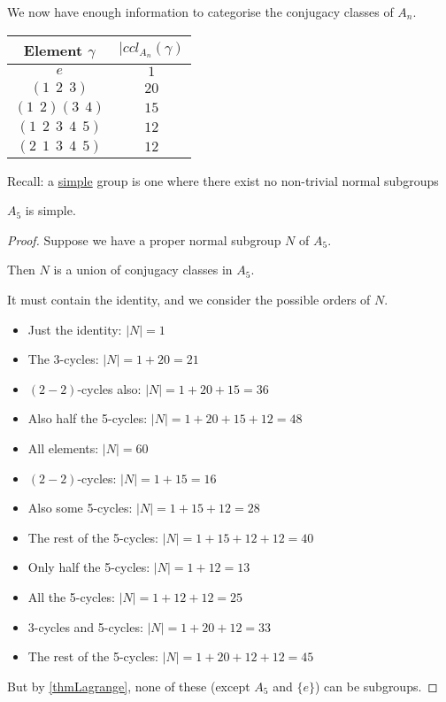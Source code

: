 \documentclass[../Main.tex]{subfiles}
\begin{document}
\begin{example}
\begin{itemize}
    \end{itemize}
    We now have enough information to categorise the conjugacy classes of $A_n$.\par
    \begin{tabular}{c|c}
        Element $\gamma$ & $|ccl_{A_n}(\gamma)$ \\
        \hline
        $e$ & $1$ \\
        $(1~~2~~3)$ & $20$ \\
        $(1~~2)(3~~4)$ & $15$ \\
        $(1~~2~~3~~4~~5)$ & $12$ \\
        $(2~~1~~3~~4~~5)$ & $12$
    \end{tabular}
\end{example}
Recall: a \underline{simple} group is one where there exist no non-trivial normal subgroups\par %
\begin{theorem}
    $A_5$ is simple. \label{thmA5Simple}
\end{theorem}
\begin{proof}
    Suppose we have a proper normal subgroup $N$ of $A_5$.\par
    Then $N$ is a union of conjugacy classes in $A_5$.\par
    It must contain the identity, and we consider the possible orders of $N$.
    \begin{itemize}
        \item Just the identity: $|N| = 1$
        \item The 3-cycles: $|N| = 1+20=21$
        \item $(2-2)$-cycles also: $|N| = 1+20+15 = 36$
        \item Also half the 5-cycles: $|N| = 1+20+15+12=48$
        \item All elements: $|N| = 60$
        \item $(2-2)$-cycles: $|N| = 1+15 = 16$
        \item Also some 5-cycles: $|N| = 1+15+12 = 28$
        \item The rest of the 5-cycles: $|N| = 1+15+12+12 = 40$
        \item Only half the 5-cycles: $|N| = 1+12 = 13$
        \item All the 5-cycles: $|N| = 1+12+12 = 25$
        \item 3-cycles and 5-cycles: $|N| = 1+20+12 = 33$
        \item The rest of the 5-cycles: $|N| = 1+20+12+12 = 45$
    \end{itemize}
    But by \ref{thmLagrange}, none of these (except $A_5$ and $\{e\}$) can be subgroups.
\end{proof}
\end{document}
